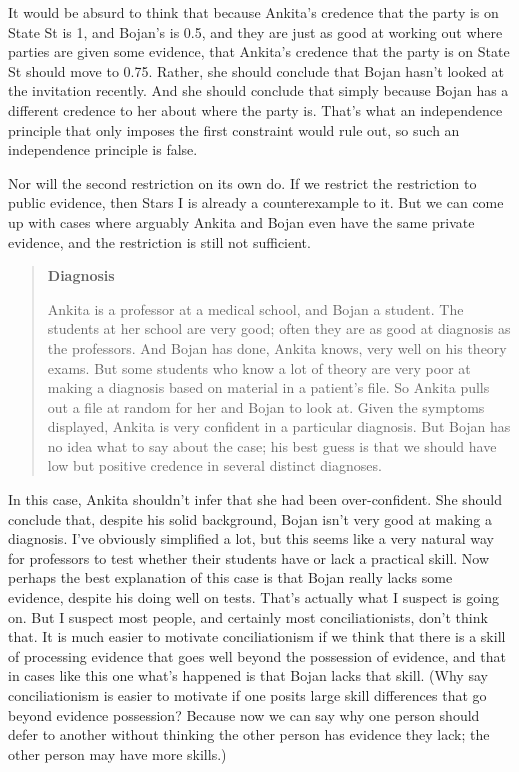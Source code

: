 \documentclass[
  10pt,
  letterpaper,
  twoside]{scrbook}
\begin{document}
It would be absurd to think that because {Ankita}'s credence that the
party is on State St is 1, and {Bojan}'s is 0.5, and they are just as
good at working out where parties are given some evidence, that
{Ankita}'s credence that the party is on State St should move to 0.75.
Rather, she should conclude that {Bojan} hasn't looked at the invitation
recently. And she should conclude that simply because {Bojan} has a
different credence to her about where the party is. That's what an
independence principle that only imposes the first constraint would rule
out, so such an independence principle is false.

Nor will the second restriction on its own do. If we restrict the
restriction to public evidence, then Stars I is already a counterexample
to it. But we can come up with cases where arguably {Ankita} and {Bojan}
even have the same private evidence, and the restriction is still not
sufficient.

\begin{quote}
\textbf{Diagnosis}

{Ankita} is a professor at a medical school, and {Bojan} a student. The
students at her school are very good; often they are as good at
diagnosis as the professors. And {Bojan} has done, {Ankita} knows, very
well on his theory exams. But some students who know a lot of theory are
very poor at making a diagnosis based on material in a patient's file.
So {Ankita} pulls out a file at random for her and {Bojan} to look at.
Given the symptoms displayed, {Ankita} is very confident in a particular
diagnosis. But {Bojan} has no idea what to say about the case; his best
guess is that we should have low but positive credence in several
distinct diagnoses.
\end{quote}

In this case, {Ankita} shouldn't infer that she had been over-confident.
She should conclude that, despite his solid background, {Bojan} isn't
very good at making a diagnosis. I've obviously simplified a lot, but
this seems like a very natural way for professors to test whether their
students have or lack a practical skill. Now perhaps the best
explanation of this case is that {Bojan} really lacks some evidence,
despite his doing well on tests. That's actually what I suspect is going
on. But I suspect most people, and certainly most conciliationists,
don't think that. It is much easier to motivate conciliationism if we
think that there is a skill of processing evidence that goes well beyond
the possession of evidence, and that in cases like this one what's
happened is that {Bojan} lacks that skill. (Why say conciliationism is
easier to motivate if one posits large skill differences that go beyond
evidence possession? Because now we can say why one person should defer
to another without thinking the other person has evidence they lack; the
other person may have more skills.)
\end{document}
